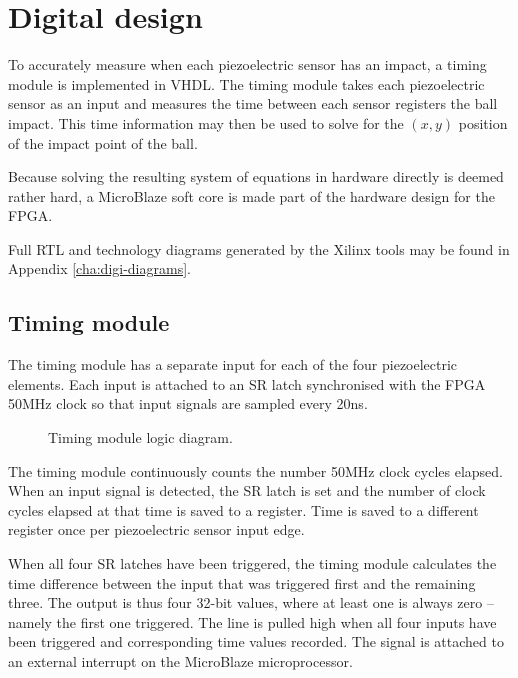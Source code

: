 \chapter{Digital design}
\label{cha:digidesign}

To accurately measure when each piezoelectric sensor has an impact, %
a timing module is implemented in VHDL.
The timing module takes each piezoelectric sensor as an input and measures the time between each sensor registers the ball impact.
This time information may then be used to solve for the $(x,y)$ position of the impact point of the ball.

Because solving the resulting system of equations in hardware directly is deemed rather hard, %
 a MicroBlaze soft core is made part of the hardware design for the FPGA.

 Full RTL and technology diagrams generated by the Xilinx tools may be found in Appendix \ref{cha:digi-diagrams}.

\section{Timing module}
\label{sec:timing_module}
The timing module has a separate input for each of the four piezoelectric elements.
Each input is attached to an SR latch synchronised with the FPGA 50\si{MHz} clock so that input signals are sampled every 20\si{ns}.

\begin{figure}[htb]
    \centering
    
    \caption{Timing module logic diagram.}
    \label{fig:timing}
\end{figure}

The timing module continuously counts the number 50\si{MHz} clock cycles elapsed.
When an input signal is detected, the SR latch is set and the number of clock cycles elapsed at that time is saved to a register.
Time is saved to a different register once per piezoelectric sensor input edge.

When all four SR latches have been triggered, the timing module calculates the time difference between the input that was triggered first and the remaining three.
The output is thus four 32-bit values, where at least one is always zero -- namely the first one triggered.
The line  is pulled high when all four inputs have been triggered and corresponding time values recorded.
The  signal is attached to an external interrupt on the MicroBlaze microprocessor.


